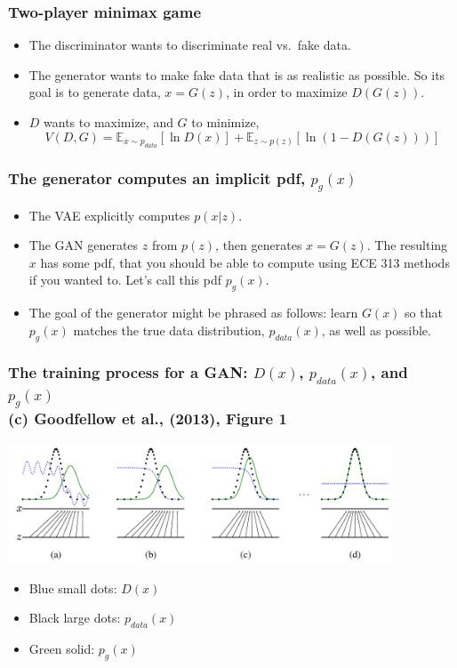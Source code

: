 \documentclass{beamer}
\begin{document}
\begin{frame}
  \frametitle{Two-player minimax game}

  \begin{itemize}
  \item The discriminator wants to discriminate real vs.~fake data.
  \item The generator wants to make fake data that is as realistic as
    possible.  So its goal is to generate data, $x=G(z)$, in order to
    maximize $D(G(z))$.
  \item $D$ wants to maximize, and $G$ to minimize,
    \begin{displaymath}
      V(D,G)= \mathbb{E}_{x\sim p_{data}}\left[\ln D(x)\right]
      +\mathbb{E}_{z\sim p(z)}\left[\ln\left(1-D(G(z))\right)\right]
    \end{displaymath}
  \end{itemize}
\end{frame}

\begin{frame}
  \frametitle{The generator computes an implicit pdf, $p_g(x)$}

  \begin{itemize}
  \item The VAE explicitly computes $p(x|z)$.
  \item The GAN generates $z$ from $p(z)$, then generates $x=G(z)$.
    The resulting $x$ has some pdf, that you should be able to compute
    using ECE 313 methods if you wanted to.  Let's call this pdf
    $p_g(x)$.
  \item The goal of the generator might be phrased as follows: learn
    $G(x)$ so that $p_g(x)$ matches the true data distribution,
    $p_{data}(x)$, as well as possible.
  \end{itemize}
\end{frame}

\begin{frame}
  \frametitle{The training process for a GAN: $D(x)$, $p_{data}(x)$, and $p_g(x)$\\
    (c) Goodfellow et al., (2013), Figure 1}

  \centerline{\includegraphics[width=4.5in]{goodfellow2014fig1.png}}
  \begin{itemize}
  \item {\color{blue}Blue small dots: $D(x)$}
  \item Black large dots: $p_{data}(x)$
  \item {\color{ForestGreen}Green solid: $p_g(x)$}
  \end{itemize}
\end{frame}
\end{document}
